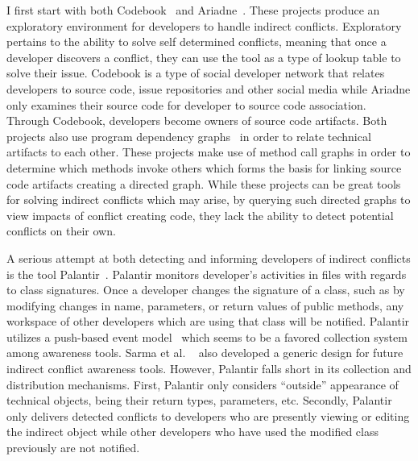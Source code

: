 I first start with both Codebook~\cite{Begel:2010:CDE} and 
Ariadne~\cite{Trainer:2005:BGT}. These projects produce an exploratory
environment for developers to handle indirect conflicts. Exploratory
pertains to the ability to solve self determined conflicts, meaning that
once a developer discovers a conflict, they can use the tool as a type of
lookup table to solve their issue. Codebook is a type of social developer
network that relates developers to source code, issue repositories and
other social media while Ariadne only examines their source code for developer
to source code association. Through Codebook, developers become
owners of source code artifacts. Both projects also use program 
dependency graphs~\cite{Horwitz:1992:UPD}
in order to relate technical artifacts to each other. These projects make 
use of method call graphs in order to 
determine which methods invoke others which forms the basis for 
linking source code artifacts creating a directed graph. While these 
projects can be great tools 
for solving indirect conflicts which may arise, by querying such directed
graphs to view impacts of conflict creating code, they lack the ability to
detect potential conflicts on their own.

A serious attempt at both detecting and informing developers of
indirect conflicts is the tool Palantir~\cite{Sarma:2007:TSA}. Palantir
monitors developer's activities in files with regards to class signatures.
Once a developer changes the signature of a class, such as by modifying changes
in name, parameters, or return values of public methods, any workspace
of other developers which are using that class will be notified. Palantir utilizes
a push-based event model~\cite{Fitzpatrick:2002:SPA} which seems to be
a favored collection system among awareness tools. Sarma et al.
~\cite{Sarma:2007:TSA} also
developed a generic design for future indirect conflict awareness tools. 
However, Palantir falls short in its collection and distribution
mechanisms. First, Palantir only considers ``outside'' appearance of technical
objects, being their return types, parameters, etc. Secondly, Palantir 
only delivers
detected conflicts to developers who are presently viewing or editing
the indirect object while other developers who have used the modified 
class previously are not notified.

